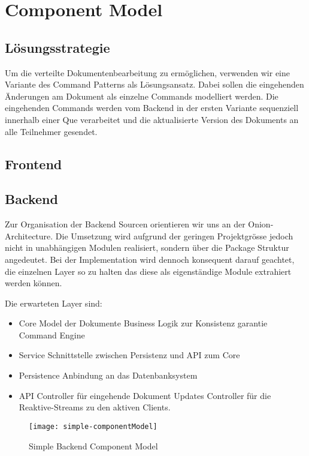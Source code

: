 \section{Component Model}

\subsection{Lösungsstrategie}
Um die verteilte Dokumentenbearbeitung zu ermöglichen, verwenden wir eine Variante des Command Patterns als Lösungsansatz.
Dabei sollen die eingehenden Änderungen am Dokument als einzelne Commands modelliert werden.
Die eingehenden Commands werden vom Backend in der ersten Variante sequenziell innerhalb einer Que verarbeitet und die aktualisierte Version des Dokuments an alle Teilnehmer gesendet.

\subsection{Frontend}

\subsection{Backend}
Zur Organisation der Backend Sourcen orientieren wir uns an der Onion-Architecture.
Die Umsetzung wird aufgrund der geringen Projektgrösse jedoch nicht in unabhängigen Modulen realisiert, sondern über die Package Struktur angedeutet.
Bei der Implementation wird dennoch konsequent darauf geachtet, die einzelnen Layer so zu halten das diese als eigenständige Module extrahiert werden können.

Die erwarteten Layer sind:
\begin{itemize}
    \item Core
    \subitem Model der Dokumente
    \subitem Business Logik zur Konsistenz garantie
    \subitem Command Engine
    \item Service
    \subitem Schnittstelle zwischen Persistenz und API zum Core
    \item Persistence
    \subitem Anbindung an das Datenbanksystem
    \item API
    \subitem Controller für eingehende Dokument Updates
    \subitem Controller für die Reaktive-Streams zu den aktiven Clients.
\end{itemize}

\begin{figure}
    \texttt{[image: simple-componentModel]}
    \caption{Simple Backend Component Model}
\end{figure}
